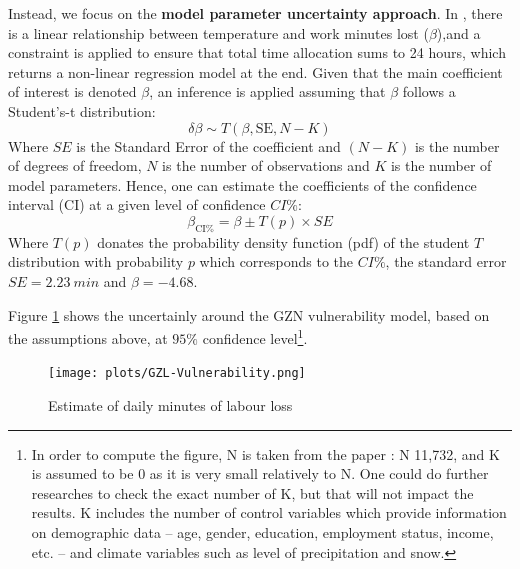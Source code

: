 \documentclass[a4paper,11pt]{extarticle} %
\begin{document}
Instead, we focus on the \textbf{model parameter uncertainty approach}. In \cite{ZhangAndShindell:2021}, there is a linear relationship between temperature and work minutes lost ($\beta$),and a constraint is applied to ensure that total time allocation sums to 24 hours, which returns a non-linear regression model at the end. Given that the main coefficient of interest is denoted $\beta$, an inference is applied assuming that $\beta$ follows a Student's-t distribution:
\begin{equation}
 \label{Eq:uncertaintyStudentT}
 \delta \beta \sim T(\beta, \mathrm{SE}, N-K)
\end{equation}
Where $SE$ is the Standard Error of the coefficient and $(N-K)$ is the number of degrees of freedom, $N$ is the number of observations and $K$ is the number of model parameters. Hence, one can estimate the coefficients of the confidence interval (CI) at a given level of confidence $CI\%$:
\begin{equation}
 \label{Eq:CIStudent}
 \beta_{\mathrm{CI\%}} = \beta \pm T(p) \times SE
\end{equation}
Where $T(p)$ donates the probability density function (pdf) of the student $T$ distribution with probability $p$ which corresponds to the $CI\%$, the standard error $SE = 2.23 \ min$ and $\beta =  - 4.68$.


Figure \ref{fig:GZL-Vulnerability} shows the uncertainly around the GZN vulnerability model, based on the assumptions above, at $95\%$ confidence level\footnote{In order to compute the figure, N is taken from the paper \cite{TemperatureAndWork:2021}: N 11,732, and K is assumed to be 0 as it is very small relatively to N. One could do further researches to check the exact number of K, but that will not impact the results. K includes the number of control variables which provide information on demographic data -- age, gender, education, employment status, income, etc. -- and climate variables such as level of precipitation and snow.}.
\begin{figure}[h]
    \centering
    \texttt{[image: plots/GZL-Vulnerability.png]}
    \caption{Estimate of daily minutes of labour loss}
    \label{fig:GZL-Vulnerability}
\end{figure}
\end{document}
